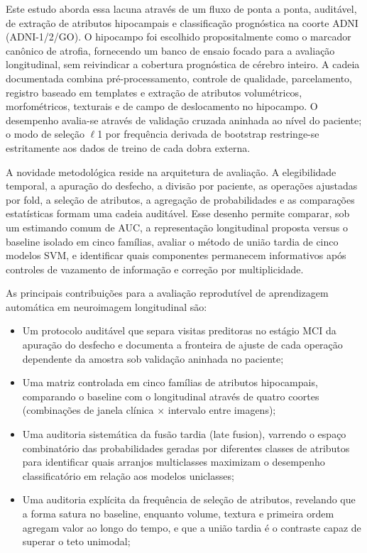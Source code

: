 \documentclass[review]{elsarticle}
\begin{document}
	Este estudo aborda essa lacuna através de um fluxo de ponta a ponta, auditável, de extração de atributos hipocampais e classificação prognóstica na coorte ADNI (ADNI-1/2/GO). O hipocampo foi escolhido propositalmente como o marcador canônico de atrofia, fornecendo um banco de ensaio focado para a avaliação longitudinal, sem reivindicar a cobertura prognóstica de cérebro inteiro. A cadeia documentada combina pré-processamento, controle de qualidade, parcelamento, registro baseado em templates e extração de atributos volumétricos, morfométricos, texturais e de campo de deslocamento no hipocampo. O desempenho avalia-se através de validação cruzada aninhada ao nível do paciente; o modo de seleção $\ell$1 por frequência derivada de bootstrap restringe-se estritamente aos dados de treino de cada dobra externa.
	
	A novidade metodológica reside na arquitetura de avaliação. A elegibilidade temporal, a apuração do desfecho, a divisão por paciente, as operações ajustadas por fold, a seleção de atributos, a agregação de probabilidades e as comparações estatísticas formam uma cadeia auditável. Esse desenho permite comparar, sob um estimando comum de AUC, a representação longitudinal proposta versus o baseline isolado em cinco famílias, avaliar o método de união tardia de cinco modelos SVM, e identificar quais componentes permanecem informativos após controles de vazamento de informação e correção por multiplicidade.
	
	As principais contribuições para a avaliação reprodutível de aprendizagem automática em neuroimagem longitudinal são:
	\begin{itemize}
		\item Um protocolo auditável que separa visitas preditoras no estágio MCI da apuração do desfecho e documenta a fronteira de ajuste de cada operação dependente da amostra sob validação aninhada no paciente;
		
		\item Uma matriz controlada em cinco famílias de atributos hipocampais, comparando o baseline com o longitudinal através de quatro coortes (combinações de janela clínica $\times$ intervalo entre imagens);
		
		\item Uma auditoria sistemática da fusão tardia (late fusion), varrendo o espaço combinatório das probabilidades geradas por diferentes classes de atributos para identificar quais arranjos multiclasses maximizam o desempenho classificatório em relação aos modelos uniclasses;
		
		\item Uma auditoria explícita da frequência de seleção de atributos, revelando que a forma satura no baseline, enquanto volume, textura e primeira ordem agregam valor ao longo do tempo, e que a união tardia é o contraste capaz de superar o teto unimodal;
	\end{itemize}
	
\end{document}
